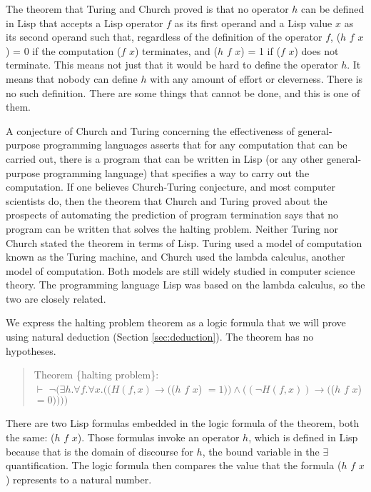 The theorem that Turing and Church proved is that
no operator $h$ can be defined in Lisp
that accepts a Lisp operator $f$ as its
first operand and a Lisp value $x$ as its second operand
such that, regardless of the definition of the operator $f$,
($h$ $f$ $x$) = 0 if the computation ($f$ $x$) terminates, and
($h$ $f$ $x$) = 1 if ($f$ $x$) does not terminate.
This means not just that it would be hard to define the operator $h$.
It means that nobody can define $h$ with any amount of effort or cleverness.
There is no such definition.
There are some things that cannot be done, and this is one of them.

\label{church-turing-hypothesis}
A conjecture of Church and Turing
concerning the effectiveness of general-purpose programming languages
asserts that for any computation that can be carried out, there is a program
that can be written in Lisp (or any other general-purpose programming language)
that specifies a way to carry out the computation.
If one believes Church-Turing conjecture, and most computer scientists do,
then the theorem that Church and Turing proved about the prospects of
automating the prediction of program termination
says that no program can be written that solves the halting problem.
Neither Turing nor Church stated the theorem in terms of Lisp.
Turing used a model of computation known as the Turing machine, and
Church used the lambda calculus, another model of computation.
Both models are still widely studied in computer science theory.
The programming language Lisp
was based on the lambda calculus, so the two are closely related.

We express the halting problem theorem as a logic formula that we will prove
using natural deduction (Section \ref{sec:deduction}).
The theorem has no hypotheses.
\begin{quote}
Theorem \{halting problem\}:\\
$\vdash$ $\neg(\exists h. \forall f. \forall x.
((H(f, x) \rightarrow ($($h$ $f$ $x$) $ = 1)) \wedge ((\neg H(f, x)) \rightarrow ($($h$ $f$ $x$) $= 0))))$
\end{quote}

There are two Lisp formulas embedded in
the logic formula of the theorem, both the same:
($h$ $f$ $x$).
Those formulas invoke an operator $h$, which is defined in Lisp because that is the domain
of discourse for $h$, the bound variable in the $\exists$ quantification.
The logic formula then compares the value that
the formula ($h$ $f$ $x$) represents to a natural number.

